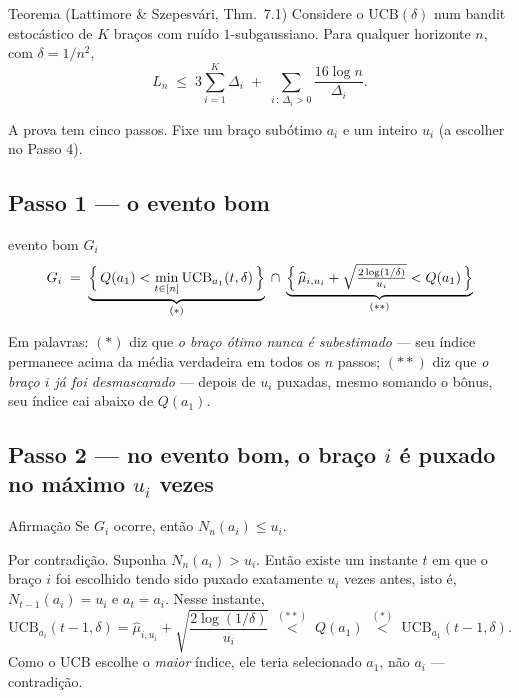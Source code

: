 \documentclass[11pt]{article}
\newcommand{\muh}{\widehat{\mu}}
\newcommand{\ucb}{\mathrm{UCB}}
\begin{document}
\begin{teobox}{Teorema (Lattimore \& Szepesvári, Thm.\ 7.1)}
Considere o $\ucb(\delta)$ num bandit estocástico de $K$ braços com ruído
$1$-subgaussiano. Para qualquer horizonte $n$, com $\delta = 1/n^{2}$,
\[
  L_n \;\le\; 3\sum_{i=1}^{K}\Delta_i
    \;+\; \sum_{i\,:\,\Delta_i>0}\frac{16\log n}{\Delta_i}.
\]
\end{teobox}

A prova tem cinco passos. Fixe um braço subótimo $a_i$ e um inteiro $u_i$ (a
escolher no Passo 4).

\subsection{Passo 1 --- o evento bom}

\begin{defbox}{evento bom $G_i$}
\[
  G_i \;=\;
  \underbrace{\Bigl\{\, Q(a_1) < \min_{t\in[n]}\ucb_{a_1}(t,\delta)\,\Bigr\}}_{(*)}
  \;\cap\;
  \underbrace{\Bigl\{\, \muh_{i,u_i} + \sqrt{\tfrac{2\log(1/\delta)}{u_i}} < Q(a_1)\,\Bigr\}}_{(**)}
\]
\end{defbox}

Em palavras: $(*)$ diz que \emph{o braço ótimo nunca é subestimado} --- seu
índice permanece acima da média verdadeira em todos os $n$ passos; $(**)$ diz
que \emph{o braço $i$ já foi desmascarado} --- depois de $u_i$ puxadas, mesmo
somando o bônus, seu índice cai abaixo de $Q(a_1)$.

\subsection{Passo 2 --- no evento bom, o braço $i$ é puxado no máximo $u_i$ vezes}

\begin{teobox}{Afirmação}
Se $G_i$ ocorre, então $N_n(a_i) \le u_i$.
\end{teobox}

\begin{provabox}
Por contradição. Suponha $N_n(a_i) > u_i$. Então existe um instante $t$ em que
o braço $i$ foi escolhido tendo sido puxado exatamente $u_i$ vezes antes, isto
é, $N_{t-1}(a_i)=u_i$ e $a_t = a_i$. Nesse instante,
\[
  \ucb_{a_i}(t-1,\delta)
   = \muh_{i,u_i} + \sqrt{\frac{2\log(1/\delta)}{u_i}}
   \;\overset{(**)}{<}\; Q(a_1)
   \;\overset{(*)}{<}\; \ucb_{a_1}(t-1,\delta).
\]
Como o UCB escolhe o \emph{maior} índice, ele teria selecionado $a_1$, não
$a_i$ --- contradição.
\end{provabox}
\end{document}
